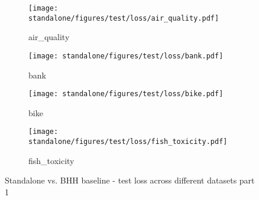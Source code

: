 \begin{figure}[htbp]
      \begin{subfigure}{0.48\textwidth}
            \centering
            \texttt{[image: standalone/figures/test/loss/air\_quality.pdf]}
            \caption{air\_quality}
            \label{fig:results:standalone:figures:test:loss:air_quality}
      \end{subfigure}
      \begin{subfigure}{0.48\textwidth}
            \centering
            \texttt{[image: standalone/figures/test/loss/bank.pdf]}
            \caption{bank}
            \label{fig:results:standalone:figures:test:loss:bank}
      \end{subfigure}
      \begin{subfigure}{0.48\textwidth}
            \centering
            \texttt{[image: standalone/figures/test/loss/bike.pdf]}
            \caption{bike}
            \label{fig:results:standalone:figures:test:loss:bike}
      \end{subfigure}
      \begin{subfigure}{0.48\textwidth}
            \centering
            \texttt{[image: standalone/figures/test/loss/fish\_toxicity.pdf]}
            \caption{fish\_toxicity}
            \label{fig:results:standalone:figures:test:loss:fish_toxicity}
      \end{subfigure}
      \caption{Standalone vs. \Acs{BHH} baseline - test loss across different datasets part 1}
      \label{fig:results:standalone:figures:test:loss:various1}
\end{figure}

